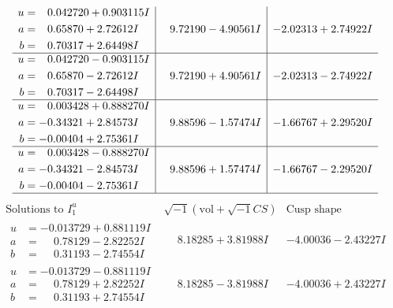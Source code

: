 \documentclass[1p]{elsarticle_modified}
\theoremstyle{definition}
\newcommand{\I}{\sqrt{-1}}
\begin{document}
$$\begin{array}{c|c|c}
\begin{aligned}
u &= \phantom{-}0.042720 + 0.903115 I \\
a &= \phantom{-}0.65870 + 2.72612 I \\
b &= \phantom{-}0.70317 + 2.64498 I\end{aligned}
 & \phantom{-}9.72190 - 4.90561 I & -2.02313 + 2.74922 I \\ \hline\begin{aligned}
u &= \phantom{-}0.042720 - 0.903115 I \\
a &= \phantom{-}0.65870 - 2.72612 I \\
b &= \phantom{-}0.70317 - 2.64498 I\end{aligned}
 & \phantom{-}9.72190 + 4.90561 I & -2.02313 - 2.74922 I \\ \hline\begin{aligned}
u &= \phantom{-}0.003428 + 0.888270 I \\
a &= -0.34321 + 2.84573 I \\
b &= -0.00404 + 2.75361 I\end{aligned}
 & \phantom{-}9.88596 - 1.57474 I & -1.66767 + 2.29520 I \\ \hline\begin{aligned}
u &= \phantom{-}0.003428 - 0.888270 I \\
a &= -0.34321 - 2.84573 I \\
b &= -0.00404 - 2.75361 I\end{aligned}
 & \phantom{-}9.88596 + 1.57474 I & -1.66767 - 2.29520 I\\
 \hline 
 \end{array}$$\newpage$$\begin{array}{c|c|c}  
\text{Solutions to }I^u_{1}& \I (\text{vol} + \sqrt{-1}CS) & \text{Cusp shape}\\
 \hline 
\begin{aligned}
u &= -0.013729 + 0.881119 I \\
a &= \phantom{-}0.78129 - 2.82252 I \\
b &= \phantom{-}0.31193 - 2.74554 I\end{aligned}
 & \phantom{-}8.18285 + 3.81988 I & -4.00036 - 2.43227 I \\ \hline\begin{aligned}
u &= -0.013729 - 0.881119 I \\
a &= \phantom{-}0.78129 + 2.82252 I \\
b &= \phantom{-}0.31193 + 2.74554 I\end{aligned}
 & \phantom{-}8.18285 - 3.81988 I & -4.00036 + 2.43227 I \\ \hline\begin{aligned}

\end{aligned}
\end{array}$$
\end{document}
